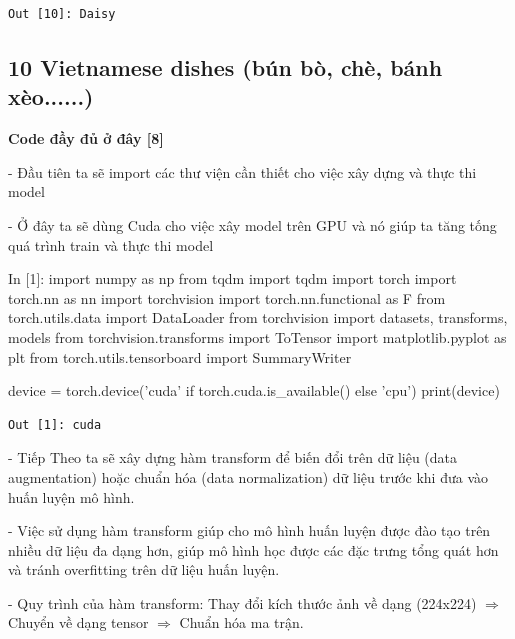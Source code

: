 \documentclass[12pt, a4paper]{article}
\begin{document}
\begin{verbatim}
Out [10]: Daisy
\end{verbatim}
















\newpage
\subsection{10 Vietnamese dishes (bún bò, chè, bánh xèo......)}
\par \textbf{Code đầy đủ ở đây [8]}
\par\hspace{0cm}- Đầu tiên ta sẽ import các thư viện cần thiết cho việc xây dựng và thực thi model
\par\hspace{0cm}- Ở đây ta sẽ dùng Cuda cho việc xây model trên GPU và nó giúp ta tăng tống quá trình train và thực thi model

\begin{python}
In [1]: import numpy as np
        from tqdm import tqdm
        import torch
        import torch.nn as nn
        import torchvision
        import torch.nn.functional as F
        from torch.utils.data import DataLoader
        from torchvision import datasets, transforms, models
        from torchvision.transforms import ToTensor
        import matplotlib.pyplot as plt
        from torch.utils.tensorboard import SummaryWriter
        
        
        device = torch.device('cuda' if torch.cuda.is_available() else 'cpu')
        print(device)

\end{python}
\begin{verbatim}
Out [1]: cuda
\end{verbatim}

\par - Tiếp Theo ta sẽ xây dựng hàm transform để biến đổi trên dữ liệu (data augmentation) hoặc chuẩn hóa (data normalization) dữ liệu trước khi đưa vào huấn luyện mô hình.
\par - Việc sử dụng hàm transform giúp cho mô hình huấn luyện được đào tạo trên nhiều dữ liệu
đa dạng hơn, giúp mô hình học được các đặc trưng tổng quát hơn và tránh overfitting trên dữ liệu huấn luyện.
\par - Quy trình của hàm transform: Thay đổi kích thước ảnh về dạng (224x224) $\Rightarrow$ Chuyển về dạng tensor $\Rightarrow$ Chuẩn hóa ma trận.
\end{document}
